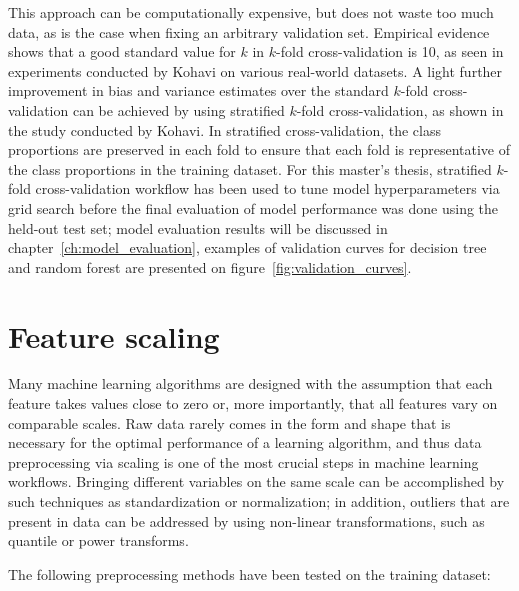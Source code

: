 This approach can be computationally expensive, but does not waste too much data, as is the case when fixing an arbitrary validation set.
Empirical evidence shows that a good standard value for $k$ in $k$-fold cross-validation is 10, as seen in experiments conducted by Kohavi on various real-world datasets\cite{Kohavi1995}.
A light further improvement in bias and variance estimates over the standard $k$-fold cross-validation can be achieved by using stratified $k$-fold cross-validation, as shown in the study conducted by Kohavi.
In stratified cross-validation, the class proportions are preserved in each fold to ensure that each fold is representative of the class proportions in the training dataset.
For this master's thesis, stratified $k$-fold cross-validation workflow has been used to tune model hyperparameters via grid search before the final evaluation of model performance was done using the held-out test set;
model evaluation results will be discussed in chapter~\ref{ch:model_evaluation}, examples of validation curves for decision tree and random forest are presented on figure~\ref{fig:validation_curves}.

\section{Feature scaling} \label{sec:feature_scaling}

Many machine learning algorithms are designed with the assumption that each feature takes values close to zero or, more importantly, that all features vary on comparable scales\cite{Scikit-learndevelopers2019b}.
Raw data rarely comes in the form and shape that is necessary for the optimal performance of a learning algorithm, and thus data preprocessing via scaling is one of the most crucial steps in machine learning workflows\cite{RaschkaMirjalili2017}.
Bringing different variables on the same scale can be accomplished by such techniques as standardization or normalization;
in addition, outliers that are present in data can be addressed by using non-linear transformations, such as quantile or power transforms.

\vspace{5mm}

The following preprocessing methods have been tested on the training dataset:


